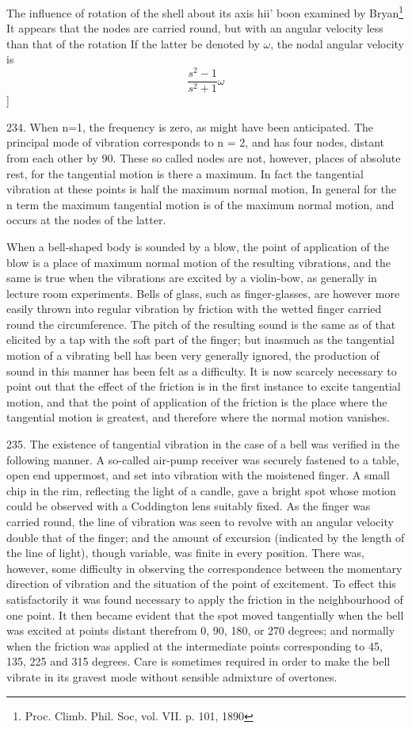 The influence of rotation of the shell about its axis hii' boon
examined by Bryan\footnote{Proc. Climb. Phil. Soc, vol. VII. p. 101, 1890}
It appears that the nodes are carried round,
but with an angular velocity less than that of the rotation
If the latter be denoted by \(\omega\), the nodal angular velocity is
\[ \frac{ s^2-1 }{ s^2+1 } \omega \]
]


234. When n=1, the frequency is zero, as might have been anticipated.
The principal mode of vibration corresponds to n = 2, and has four
nodes, distant from each other by 90. These so called nodes are not,
however, places of absolute rest, for the tangential motion is there a maximum.
In fact the tangential vibration at these points is half the maximum normal
motion, In general for the n term the maximum tangential motion is of the
maximum normal motion, and occurs at the nodes of the latter.

When a bell-shaped body is sounded by a blow, the point of application
of the blow is a place of maximum normal motion of the resulting
vibrations, and the same is true when the vibrations are excited by a
violin-bow, as generally in lecture room experiments. Bells of glass,
such as finger-glasses, are however more easily thrown into regular
vibration by friction with the wetted finger carried round the
circumference. The pitch of the resulting sound is the same as of that
elicited by a tap with the soft part of the finger; but inasmuch as the
tangential motion of a vibrating bell has been very generally ignored,
the production of sound in this manner has been felt as a difficulty. It
is now scarcely necessary to point out that the effect of the friction
is in the first instance to excite tangential motion, and that the point
of application of the friction is the place where the tangential motion
is greatest, and therefore where the normal motion vanishes.

235. The existence of tangential vibration in the case of a bell was
verified in the following manner. A so-called air-pump receiver was
securely fastened to a table, open end uppermost, and set into vibration
with the moistened finger. A small chip in the rim, reflecting the light
of a candle, gave a bright spot whose motion could be observed with a
Coddington lens suitably fixed. As the finger was carried round, the
line of vibration was seen to revolve with an angular velocity double
that of the finger; and the amount of excursion (indicated by the length
of the line of light), though variable, was finite in every position.
There was, however, some difficulty in observing the correspondence
between the momentary direction of vibration and the situation of the
point of excitement. To effect this satisfactorily it was found
necessary to apply the friction in the neighbourhood of one point. It
then became evident that the spot moved tangentially when the bell was
excited at points distant therefrom 0, 90, 180, or 270 degrees; and
normally when the friction was applied at the intermediate points
corresponding to 45, 135, 225 and 315 degrees. Care is sometimes
required in order to make the bell vibrate in its gravest mode without
sensible admixture of overtones.

